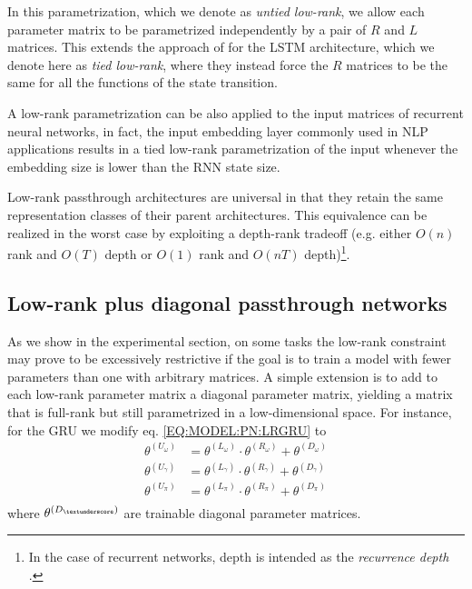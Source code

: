 \documentclass[11pt,a4paper]{article}
\begin{document}
In this parametrization, which we denote as \textit{untied low-rank}, we allow each parameter matrix to be parametrized independently by a pair of $R$ and $L$ matrices. This extends the  approach of  for the LSTM architecture, which we denote here as \textit{tied low-rank}, where they instead force the $R$ matrices to be the same for all the functions of the state transition.

A low-rank parametrization can be also applied to the input matrices of recurrent neural networks, in fact, the input embedding layer commonly used in NLP applications results in a tied low-rank parametrization of the input whenever the embedding size is lower than the RNN state size.

Low-rank passthrough architectures are universal in that they retain the same representation classes of their parent architectures. This equivalence can be realized in the worst case by exploiting a depth-rank tradeoff (e.g. either $O(n)$ rank and $O(T)$ depth or $O(1)$ rank and $O(nT)$ depth)\footnote{In the case of recurrent networks, depth is intended as the \textit{recurrence depth} \cite{Zilly2016}.}.


\subsection{Low-rank plus diagonal passthrough networks}
\label{SEC:MODEL:LRDPN}

As we show in the experimental section, on some tasks the low-rank constraint may prove to be excessively restrictive if the goal is to train a model with fewer parameters than one with arbitrary matrices. A simple extension is to add to each low-rank parameter matrix a diagonal parameter matrix, yielding a matrix that is full-rank but still parametrized in a low-dimensional space. For instance, for the GRU we modify eq. \ref{EQ:MODEL:PN:LRGRU} to
\begin{equation}
\begin{aligned}
\theta^{(U_{\omega})} &= \theta^{(L_{\omega})} \cdot \theta^{(R_{\omega})} + \theta^{(D_{\omega})} \\
\theta^{(U_{\gamma})} &= \theta^{(L_{\gamma})} \cdot \theta^{(R_{\gamma})} + \theta^{(D_{\gamma})} \\
\theta^{(U_{\pi})}  &= \theta^{(L_{\pi})} \cdot \theta^{(R_{\pi})} + \theta^{(D_{\pi})} \\
\end{aligned}
\label{EQ:MODEL:PN:LRDGRU}
\end{equation}
where $\theta^{(D_{\textunderscore})}$ are trainable diagonal parameter matrices.
\end{document}
